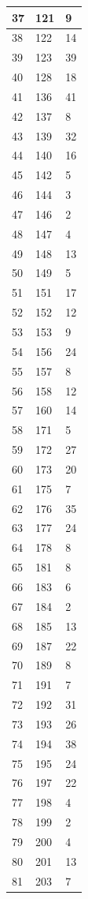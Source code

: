 \begin{tabular}{p{}p{}p{}}
\hline
37 & 121 & 9 \\
\hline
38 & 122 & 14 \\
\hline
39 & 123 & 39 \\
\hline
40 & 128 & 18 \\
\hline
41 & 136 & 41 \\
\hline
42 & 137 & 8 \\
\hline
43 & 139 & 32 \\
\hline
44 & 140 & 16 \\
\hline
45 & 142 & 5 \\
\hline
46 & 144 & 3 \\
\hline
47 & 146 & 2 \\
\hline
48 & 147 & 4 \\
\hline
49 & 148 & 13 \\
\hline
50 & 149 & 5 \\
\hline
51 & 151 & 17 \\
\hline
52 & 152 & 12 \\
\hline
53 & 153 & 9 \\
\hline
54 & 156 & 24 \\
\hline
55 & 157 & 8 \\
\hline
56 & 158 & 12 \\
\hline
57 & 160 & 14 \\
\hline
58 & 171 & 5 \\
\hline
59 & 172 & 27 \\
\hline
60 & 173 & 20 \\
\hline
61 & 175 & 7 \\
\hline
62 & 176 & 35 \\
\hline
63 & 177 & 24 \\
\hline
64 & 178 & 8 \\
\hline
65 & 181 & 8 \\
\hline
66 & 183 & 6 \\
\hline
67 & 184 & 2 \\
\hline
68 & 185 & 13 \\
\hline
69 & 187 & 22 \\
\hline
70 & 189 & 8 \\
\hline
71 & 191 & 7 \\
\hline
72 & 192 & 31 \\
\hline
73 & 193 & 26 \\
\hline
74 & 194 & 38 \\
\hline
75 & 195 & 24 \\
\hline
76 & 197 & 22 \\
\hline
77 & 198 & 4 \\
\hline
78 & 199 & 2 \\
\hline
79 & 200 & 4 \\
\hline
80 & 201 & 13 \\
\hline
81 & 203 & 7 \\
\hline
\bottomrule
\end{tabular}

